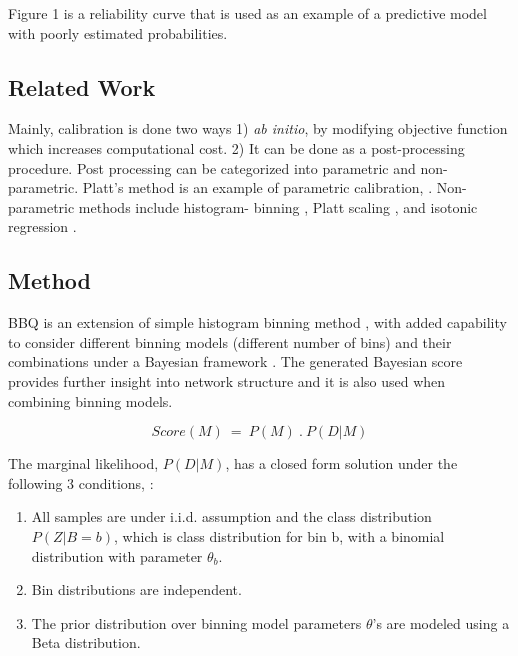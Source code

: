 \documentclass[11pt]{article}
\begin{document}
      Figure 1 is a reliability curve \cite{degroot1983comparison}
      \cite{niculescu2005predicting} that is used as an example of a predictive
      model with poorly estimated probabilities.


      \subsection{Related Work}
      \par Mainly, calibration is done two ways 1) \textit{ab initio}, by modifying
      objective function which increases computational cost. 2) It can be done as a
      post-processing procedure. Post processing can be categorized into parametric
      and non-parametric. Platt's method is an example of parametric calibration,
      \cite{platt1999probabilistic}. Non-parametric methods include histogram-
      binning \cite{zadrozny2001obtaining}, Platt scaling
      \cite{platt1999probabilistic}, and isotonic regression
      \cite{zadrozny2002transforming}.

      \subsection{Method}
      \par BBQ is an extension of simple histogram binning method
      \cite{zadrozny2001obtaining}, with added capability to consider different
      binning models (different number of bins) and their combinations under a
      Bayesian framework \cite{heckerman1995learning}. The generated Bayesian
      score provides further insight into network structure and it is also used
      when combining binning models.

      $$ \textit{Score}(M) ~=~ P(M)~.~P(D | M) $$

      The marginal likelihood, $P(D | M)$, has a closed form solution under the
      following 3 conditions, \cite{heckerman1995learning}:

      \begin{enumerate}
            \item All samples are under i.i.d. assumption and the class
            distribution $P(Z|B=b)$, which is class distribution for bin b,
            with a binomial distribution with parameter $\theta_b$.
            \item Bin distributions are independent.
            \item The prior distribution over binning model parameters $\theta$'s
            are modeled using a Beta distribution.
      \end{enumerate}
\end{document}
